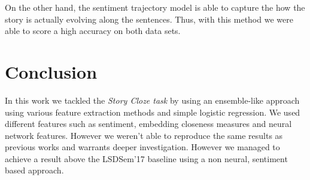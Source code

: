 \documentclass{article}
\begin{document}
On the other hand, the sentiment trajectory model is able to capture the how the
story is actually evolving along the sentences. Thus, with this method we were
able to score a high accuracy on both data sets.


\section{Conclusion}
In this work we tackled the \textit{Story Cloze task} by using an ensemble-like
approach using various feature extraction methods and simple logistic regression.
We used different features such as sentiment, embedding closeness measures and
neural network features. However we weren't able to reproduce the same results 
as previous works and warrants deeper investigation. However we managed to achieve
a result above the LSDSem'17 baseline using a non neural, sentiment based approach.



\end{document}
